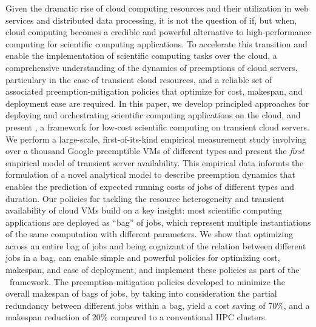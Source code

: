
Given the dramatic rise of cloud computing resources and their utilization in web services and distributed data processing, it is not the question of if, but when, cloud computing becomes a credible and powerful alternative to high-performance computing for scientific computing applications. To accelerate this transition and enable the implementation of scientific computing tasks over the cloud, a comprehensive understanding of the dynamics of preemptions of cloud servers, particulary in the case of transient cloud resources, and a reliable set of associated preemption-mitigation policies that optimize for cost, makespan, and deployment ease are required. 
In this paper, we develop principled approaches for deploying and orchestrating scientific computing applications on the cloud, and present \sysname, a framework for low-cost scientific computing on  transient cloud servers. 
We perform a large-scale, first-of-its-kind empirical measurement study involving over a thousand Google preemptible VMs of different types and present the \emph{first} empirical model of transient server availability. This empirical data informts the formulation of a novel analytical model to describe preemption dynamics that enables the prediction of expected running costs of jobs of different types and duration.
Our policies for tackling the resource heterogeneity and transient availability of cloud VMs build on a key insight: most scientific computing applications are deployed as ``bag'' of jobs, which represent multiple instantiations of the same computation with different parameters.
We show that optimizing across an entire bag of jobs and being cognizant of the relation between different jobs in a bag, can enable simple and powerful policies for optimizing cost, makespan, and ease of deployment, and implement these policies as part of the \sysname~framework. 
The preemption-mitigation policies developed to minimize the overall makespan of bags of jobs, by taking into consideration the partial redundancy between different jobs within a bag, yield a cost saving of 70\%, and a makespan reduction of 20\% compared to a conventional HPC clusters.

\vspace*{10cm}

